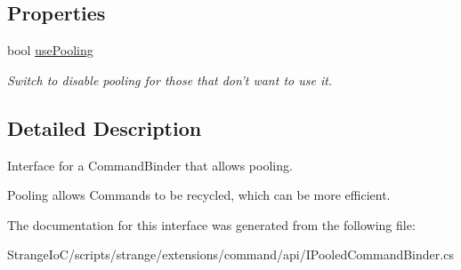 \subsection*{Properties}
\begin{DoxyCompactItemize}
\item 
\hypertarget{interfacestrange_1_1extensions_1_1command_1_1api_1_1_i_pooled_command_binder_a32124cd214df3e82664b573f16874c62}{bool \hyperlink{interfacestrange_1_1extensions_1_1command_1_1api_1_1_i_pooled_command_binder_a32124cd214df3e82664b573f16874c62}{use\-Pooling}}\label{interfacestrange_1_1extensions_1_1command_1_1api_1_1_i_pooled_command_binder_a32124cd214df3e82664b573f16874c62}

\begin{DoxyCompactList}\small\item\em Switch to disable pooling for those that don't want to use it. \end{DoxyCompactList}\end{DoxyCompactItemize}


\subsection{Detailed Description}
Interface for a Command\-Binder that allows pooling. 

Pooling allows Commands to be recycled, which can be more efficient. 

The documentation for this interface was generated from the following file\-:\begin{DoxyCompactItemize}
\item 
Strange\-Io\-C/scripts/strange/extensions/command/api/I\-Pooled\-Command\-Binder.\-cs\end{DoxyCompactItemize}
